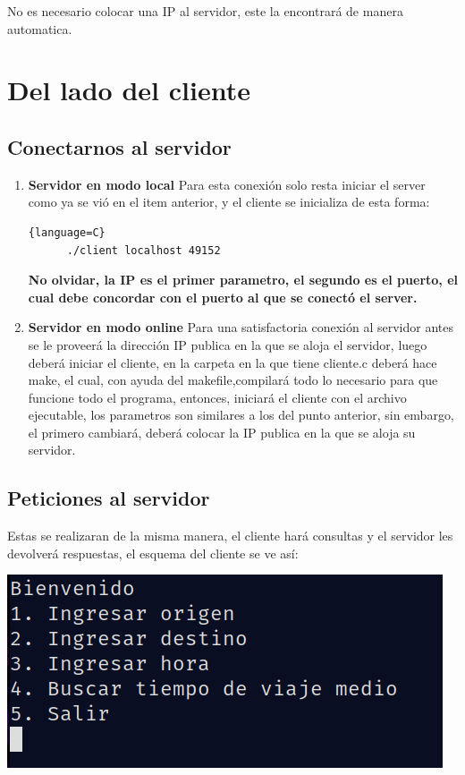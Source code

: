 \documentclass{article}
\begin{document}
No es necesario colocar una IP al servidor, este la encontrará de manera automatica.
\section{Del lado del cliente}
\subsection{Conectarnos al servidor}
\begin{enumerate}
  \item{\textbf{Servidor en modo local}}
    Para esta conexión solo resta iniciar el server como ya se vió en el item anterior, y el cliente se inicializa de esta forma:
    \begin{lstlisting}{language=C}
      ./client localhost 49152
    \end{lstlisting}
    \textbf{No olvidar, la IP es el primer parametro, el segundo es el puerto, el cual debe concordar con el puerto al que se conectó el server.}
    
  \item{\textbf{Servidor en modo online}}
Para una satisfactoria conexión al servidor antes se le proveerá la dirección IP publica en la que se aloja el servidor, luego deberá iniciar el cliente, en la carpeta en la que tiene cliente.c deberá hace make, el cual, con ayuda del makefile,compilará todo lo necesario para que funcione todo el programa, entonces, iniciará el cliente con el archivo ejecutable, los parametros son similares a los del punto anterior, sin embargo, el primero cambiará, deberá colocar la IP publica en la que se aloja su servidor.
\end{enumerate}

\subsection{Peticiones al servidor}
Estas se realizaran de la misma manera, el cliente hará consultas y el servidor les devolverá respuestas, el esquema del cliente se ve así:\\

  \begin{center}
    \includegraphics[scale=0.2]{cliente}
  \end{center}




\end{document}
